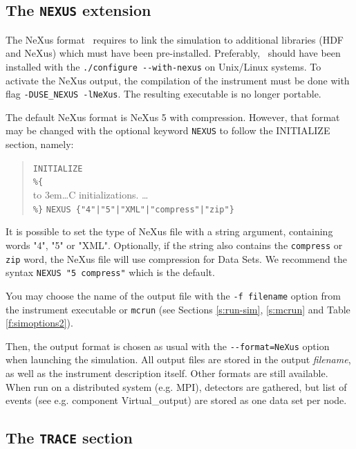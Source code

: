 \subsection{The \texttt{NEXUS} extension}
   
\label{s:nexus}

The NeXus format~\cite{nexus_webpage} requires to link the simulation to
additional libraries (HDF and NeXus) which must have been
pre-installed. Preferably, \MCS\ should have been installed with the
\verb+./configure --with-nexus+ on Unix/Linux systems. To activate the NeXus
output, the compilation of the instrument must be done with flag
\verb+-DUSE_NEXUS -lNeXus+. The resulting executable is no longer portable.

The default NeXus format is NeXus 5 with compression. However, that format may
be changed with the optional keyword \verb+NEXUS+ to follow the INITIALIZE
section, namely:

\begin{quote}
  \texttt{INITIALIZE} \\
  \verb|%{| \\
  \hbox to 3em{}\ldots C initializations. \ldots \\
  \verb|%}|
  \verb+NEXUS {"4"|"5"|"XML"|"compress"|"zip"}+
\end{quote}

It is possible to set the type of NeXus file with a string argument, containing
words "4", "5" or "XML". Optionally, if the string also contains the
\verb+compress+ or \verb+zip+ word, the NeXus file will use compression for Data
Sets. We recommend the syntax \verb+NEXUS "5 compress"+ which is the default.

You may choose the name of the output file with the \verb+-f filename+ option
from the instrument executable or \verb+mcrun+ (see Sections \ref{s:run-sim},
\ref{s:mcrun} and Table \ref{f:simoptions2}).

Then, the output format is chosen as usual with the \verb+--format=NeXus+ option
when launching the simulation. All output files are stored in the output {\it
  filename}, as well as the instrument description itself. Other formats are
still available. When run on a distributed system (e.g. MPI), detectors are
gathered, but list of events (see e.g. component Virtual\_output) are stored as
one data set per node.

\subsection{The \texttt{TRACE} section}
\label{s:trace}


